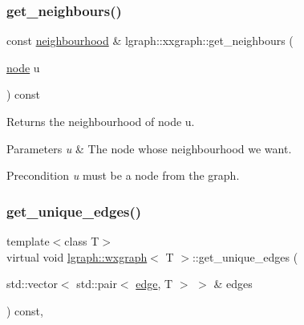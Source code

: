 \subsubsection{\texorpdfstring{get\+\_\+neighbours()}{get\_neighbours()}}
{\footnotesize\ttfamily const \hyperlink{namespacelgraph_a052e7766c13f3a43cec0aec8173fdede}{neighbourhood} \& lgraph\+::xxgraph\+::get\+\_\+neighbours (\begin{DoxyParamCaption}\item[{\hyperlink{namespacelgraph_a397169dd66adf725210a30fb7251773e}{node}}]{u }\end{DoxyParamCaption}) const\hspace{0.3cm}{\ttfamily [inherited]}}



Returns the neighbourhood of node u. 


\begin{DoxyParams}{Parameters}
{\em u} & The node whose neighbourhood we want. \\
\hline
\end{DoxyParams}
\begin{DoxyPrecond}{Precondition}
{\itshape u} must be a node from the graph. 
\end{DoxyPrecond}
\mbox{\label{classlgraph_1_1wxgraph_a50a9be174538c50c0f2a7ebeaa34ca4d}} 
\subsubsection{\texorpdfstring{get\+\_\+unique\+\_\+edges()}{get\_unique\_edges()}\hspace{0.1cm}{\footnotesize\ttfamily [1/2]}}
{\footnotesize\ttfamily template$<$class T$>$ \\
virtual void \hyperlink{classlgraph_1_1wxgraph}{lgraph\+::wxgraph}$<$ T $>$\+::get\+\_\+unique\+\_\+edges (\begin{DoxyParamCaption}\item[{std\+::vector$<$ std\+::pair$<$ \hyperlink{namespacelgraph_a76bd7d50719f03de7a85db259d80d572}{edge}, T $>$ $>$ \&}]{edges }\end{DoxyParamCaption}) const\hspace{0.3cm}{\ttfamily [protected]}, {}}



